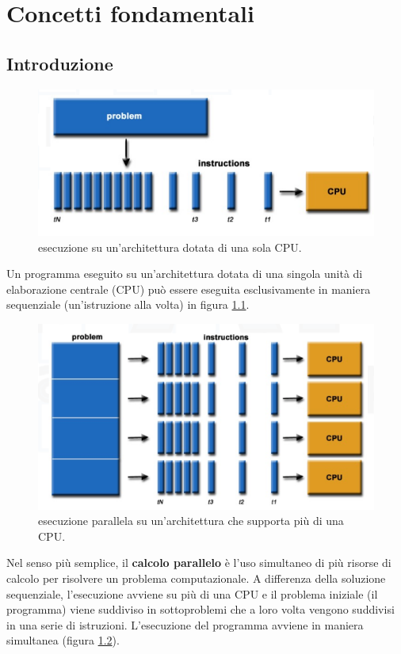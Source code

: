 \chapter{Concetti fondamentali}
\section{Introduzione}
\begin{figure}[th]
	\centering
	\includegraphics[width=0.7\linewidth]{img/single-computation}
	\caption{esecuzione su un'architettura dotata di una sola CPU.}
	\label{fig:single-computation}
\end{figure}
Un programma eseguito su un'architettura dotata di una singola unità di elaborazione centrale (CPU) può essere eseguita esclusivamente in maniera sequenziale (un'istruzione alla volta) in figura \ref{fig:single-computation}.
\begin{figure}[th]
	\centering
	\includegraphics[width=0.7\linewidth]{img/parallel-computation}
	\caption{esecuzione parallela su un'architettura che supporta più di una CPU.}
	\label{fig:parallel-computation}
\end{figure}
Nel senso più semplice, il \textbf{calcolo parallelo} è l'uso simultaneo di più risorse di calcolo per risolvere un problema computazionale. A differenza della soluzione sequenziale, l'esecuzione avviene su più di una CPU e il problema iniziale (il programma) viene suddiviso in sottoproblemi che a loro volta vengono suddivisi in una serie di istruzioni. L'esecuzione del programma avviene in maniera simultanea (figura \ref{fig:parallel-computation}).

